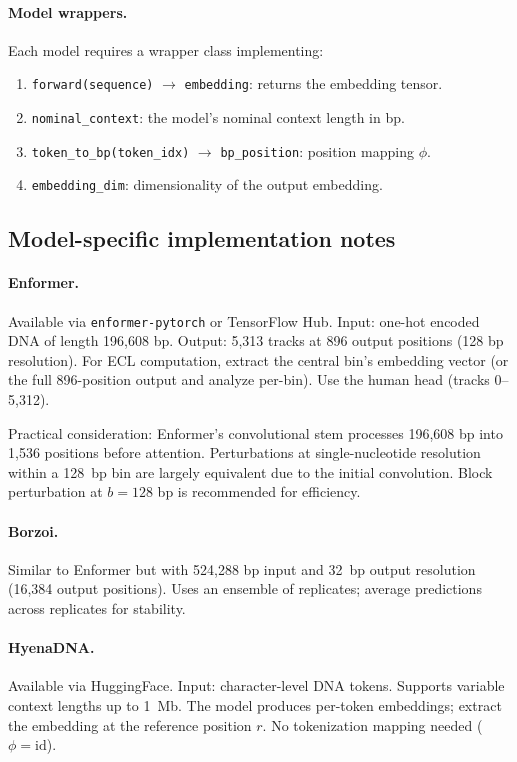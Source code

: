 \paragraph{Model wrappers.}
Each model requires a wrapper class implementing:
\begin{enumerate}[leftmargin=2em, label=(\roman*)]
\item \texttt{forward(sequence)} $\to$ \texttt{embedding}: returns the embedding tensor.
\item \texttt{nominal\_context}: the model's nominal context length in bp.
\item \texttt{token\_to\_bp(token\_idx)} $\to$ \texttt{bp\_position}: position mapping $\phi$.
\item \texttt{embedding\_dim}: dimensionality of the output embedding.
\end{enumerate}

\subsection{Model-specific implementation notes}

\paragraph{Enformer.}
Available via \texttt{enformer-pytorch} or TensorFlow Hub. Input: one-hot encoded DNA of length 196,608 bp. Output: 5,313 tracks at 896 output positions (128 bp resolution). For ECL computation, extract the central bin's embedding vector (or the full 896-position output and analyze per-bin). Use the human head (tracks 0--5,312).

Practical consideration: Enformer's convolutional stem processes 196,608 bp into 1,536 positions before attention. Perturbations at single-nucleotide resolution within a 128~bp bin are largely equivalent due to the initial convolution. Block perturbation at $b=128$ bp is recommended for efficiency.

\paragraph{Borzoi.}
Similar to Enformer but with 524,288 bp input and 32~bp output resolution (16,384 output positions). Uses an ensemble of replicates; average predictions across replicates for stability.

\paragraph{HyenaDNA.}
Available via HuggingFace. Input: character-level DNA tokens. Supports variable context lengths up to 1~Mb. The model produces per-token embeddings; extract the embedding at the reference position $r$. No tokenization mapping needed ($\phi = \mathrm{id}$).

